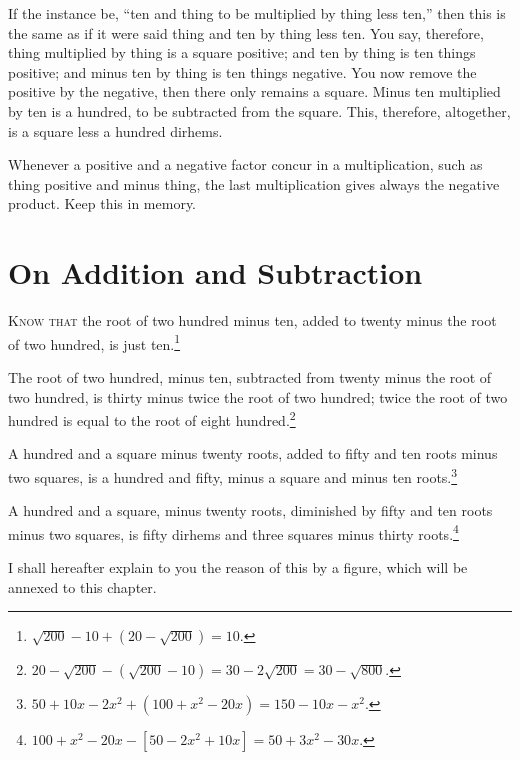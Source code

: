If the instance be, ``ten and thing to be multiplied by thing less ten,'' then this is the same as if it were said thing and ten by thing less ten. You say, therefore, thing multiplied by thing is a square positive; and ten by thing is ten things positive; and minus ten by thing is ten things negative. You now remove the positive by the negative, then there only remains a square. Minus ten multiplied by ten is a hundred, to be subtracted from the square. This, therefore, altogether, is a square less a hundred dirhems.

Whenever a positive and a negative factor concur in a multiplication, such as thing positive and minus thing, the last multiplication gives always the negative product. Keep this in memory.

\clearpage

\section*{On Addition and Subtraction}

\lettrine{K}{now that} the root of two hundred minus ten, added to twenty minus the root of two hundred, is just ten.\footnote{$\sqrt{200} - 10 + (20 - \sqrt{200}) = 10$.}

The root of two hundred, minus ten, subtracted from twenty minus the root of two hundred, is thirty minus twice the root of two hundred; twice the root of two hundred is equal to the root of eight hundred.\footnote{$20 - \sqrt{200} - (\sqrt{200} - 10) = 30 - 2\sqrt{200} = 30 - \sqrt{800}$.}

A hundred and a square minus twenty roots, added to fifty and ten roots minus two squares, is a hundred and fifty, minus a square and minus ten roots.\footnote{$50 + 10x - 2x^2 + (100 + x^2 - 20x) = 150 - 10x - x^2$.}

A hundred and a square, minus twenty roots, diminished by fifty and ten roots minus two squares, is fifty dirhems and three squares minus thirty roots.\footnote{$100 + x^2 - 20x - [50 - 2x^2 + 10x] = 50 + 3x^2 - 30x$.}

I shall hereafter explain to you the reason of this by a figure, which will be annexed to this chapter.

